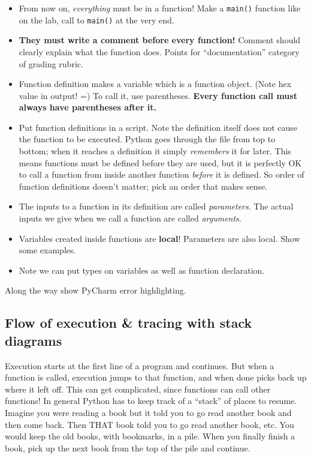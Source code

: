 \documentclass{article}
\begin{document}
\begin{itemize}
\item From now on, \emph{everything} must be in a function!  Make a
  \verb|main()| function like on the lab, call to \verb|main()| at the
  very end.

\item \textbf{They must write a comment before every function!}
  Comment should clearly explain what the function does.  Points for
  ``documentation'' category of grading rubric.

\item Function definition makes a variable which is a function
  object. (Note hex value in output! =) To call it, use parentheses.
  \textbf{Every function call must always have parentheses after it.}

\item Put function definitions in a script.  Note the definition
  itself does not cause the function to be executed.  Python goes
  through the file from top to bottom; when it reaches a definition it
  simply \emph{remembers} it for later.  This means functions must be
  defined before they are used, but it is perfectly OK to call a
  function from inside another function \emph{before} it is defined.
  So order of function definitions doesn't matter; pick an order that
  makes sense.

\item The inputs to a function in its definition are called
  \emph{parameters}.  The actual inputs we give when we call a
  function are called \emph{arguments}.

\item Variables created inside functions are \textbf{local}!
  Parameters are also local.  Show some examples.

\item Note we can put types on variables as well as function
  declaration.
\end{itemize}

Along the way show PyCharm error highlighting.

\subsection*{Flow of execution \& tracing with stack diagrams}

Execution starts at the first line of a program and continues.  But
when a function is called, execution jumps to that function, and when
done picks back up where it left off.  This can get complicated, since
functions can call other functions!  In general Python has to keep
track of a ``stack'' of places to resume.  Imagine you were reading a
book but it told you to go read another book and then come back.  Then
THAT book told you to go read another book, etc.  You would keep the
old books, with bookmarks, in a pile.  When you finally finish a book,
pick up the next book from the top of the pile and continue.
\end{document}

